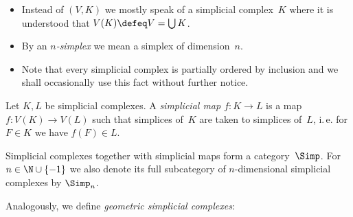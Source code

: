 \begin{thConvention}
    \begin{itemize}
        \item
            Instead of $(V,K)$ we mostly speak of a simplicial complex~$K$ where it
            is understood that $V(K)\defeq V = \bigcup K$.
            
        \item
            By an \emph{$n$-simplex} we mean a simplex of dimension~$n$.
            
        \item
            Note that every simplicial complex is partially ordered by
            inclusion and we shall occasionally use this fact without
            further notice.
    \end{itemize}
\end{thConvention}

\begin{thDef}
    Let $K,L$ be simplicial complexes. A \emph{simplicial map $f\colon K\to L$}
    is a map $f\colon V(K)\to V(L)$ such that simplices of~$K$ are taken to
    simplices of~$L$, i.\,e. for $F\in K$ we have $f(F) \in L$.
\end{thDef}

\begin{thDef}
    Simplicial complexes together with simplicial maps form a category~$\Simp$.
    For $n\in\N\cup\{-1\}$ we also denote its full subcategory of
    $n$-dimensional simplicial complexes by $\Simp_n$.
\end{thDef}

Analogously, we define \emph{geometric simplicial complexes}:

